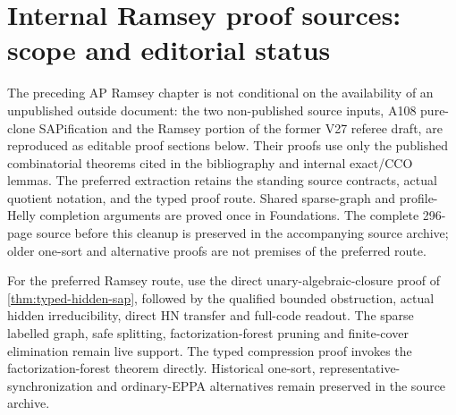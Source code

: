 \documentclass[11pt,a4paper]{article}
\theoremstyle{remark}\newtheorem{remark}[theorem]{Remark}
\theoremstyle{definition}
\theoremstyle{remark}
\begin{document}


\appendix
\section*{Internal Ramsey proof sources: scope and editorial status}
The preceding AP Ramsey chapter is not conditional on the availability of
an unpublished outside document: the two non-published source inputs, A108
pure-clone SAPification and the Ramsey portion of the former V27 referee
draft, are reproduced as editable proof sections below. Their proofs use
only the published combinatorial theorems cited in the bibliography and
internal exact/CCO lemmas. The preferred extraction retains the standing source contracts, actual
quotient notation, and the typed proof route. Shared sparse-graph and
profile-Helly completion arguments are proved once in Foundations.
The complete 296-page source before this cleanup is preserved in the
accompanying source archive; older one-sort and alternative proofs are
not premises of the preferred route.

For the preferred Ramsey route, use the direct unary-algebraic-closure
proof of \cref{thm:typed-hidden-sap}, followed by the qualified bounded
obstruction, actual hidden irreducibility, direct HN transfer and full-code
readout. The sparse labelled graph, safe splitting, factorization-forest
pruning and finite-cover elimination remain live support. The typed
compression proof invokes the factorization-forest theorem directly.
Historical one-sort, representative-synchronization and ordinary-EPPA
alternatives remain preserved in the source archive.


\end{document}
